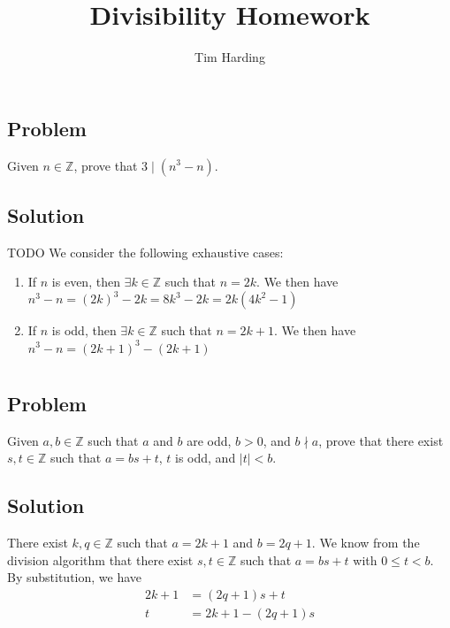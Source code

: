 \documentclass[12pt]{article}
\title{Divisibility Homework}
\author{Tim Harding}
\newcommand{\abs}  [1]{\left|       #1 \right|      }
\newcommand{\Z}    [0]{\mathbb{Z}                   }
\begin{document}
\maketitle

\section{}

\subsection{Problem}
Given $n \in \mathbb{Z}$, prove that $3 \mid (n^3 - n)$.

\subsection{Solution}
TODO
We consider the following exhaustive cases:
\begin{enumerate}
    \item If $n$ is even, then $\exists k \in \Z$ such that $n = 2k$. We then have $n^3 - n = (2k)^3 - 2k = 8k^3 - 2k = 2k(4k^2 - 1)$
    \item If $n$ is odd, then $\exists k \in \Z$ such that $n = 2k + 1$. We then have $n^3 - n = (2k + 1)^3 - (2k + 1)$
\end{enumerate}



\section{}

\subsection{Problem}
Given $a, b \in \Z$ such that $a$ and $b$ are odd, $b > 0$, and $b \nmid a$, prove that there exist $s, t \in \Z$ such that $a = bs + t$, $t$ is odd, and $\abs{t} < b$.

\subsection{Solution}
There exist $k, q \in \Z$ such that $a = 2k + 1$ and $b = 2q + 1$. We know from the division algorithm that there exist $s, t \in \Z$ such that $a = bs + t$ with $0 \leq t < b$. By substitution, we have
\begin{align*}
    2k + 1 &= (2q + 1)s + t \\
    t &= 2k + 1 - (2q + 1)s
\end{align*}
\end{document}
